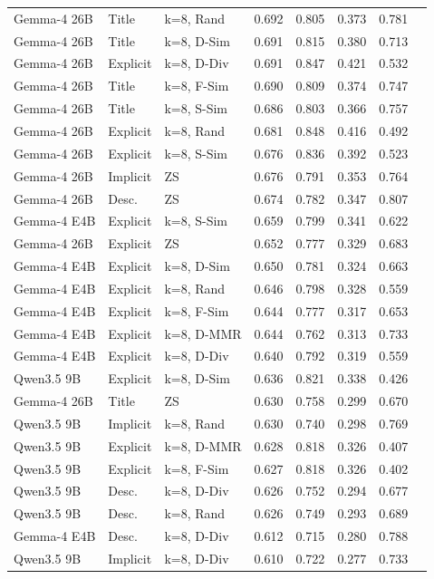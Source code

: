 \begin{longtable}{lllrrrrr}
Gemma-4 26B & Title & k=8, Rand & 0.692 & 0.805 & 0.373 & 0.781 \\
Gemma-4 26B & Title & k=8, D-Sim & 0.691 & 0.815 & 0.380 & 0.713 \\
Gemma-4 26B & Explicit & k=8, D-Div & 0.691 & 0.847 & 0.421 & 0.532 \\
Gemma-4 26B & Title & k=8, F-Sim & 0.690 & 0.809 & 0.374 & 0.747 \\
Gemma-4 26B & Title & k=8, S-Sim & 0.686 & 0.803 & 0.366 & 0.757 \\
Gemma-4 26B & Explicit & k=8, Rand & 0.681 & 0.848 & 0.416 & 0.492 \\
Gemma-4 26B & Explicit & k=8, S-Sim & 0.676 & 0.836 & 0.392 & 0.523 \\
Gemma-4 26B & Implicit & ZS & 0.676 & 0.791 & 0.353 & 0.764 \\
Gemma-4 26B & Desc. & ZS & 0.674 & 0.782 & 0.347 & 0.807 \\
Gemma-4 E4B & Explicit & k=8, S-Sim & 0.659 & 0.799 & 0.341 & 0.622 \\
Gemma-4 26B & Explicit & ZS & 0.652 & 0.777 & 0.329 & 0.683 \\
Gemma-4 E4B & Explicit & k=8, D-Sim & 0.650 & 0.781 & 0.324 & 0.663 \\
Gemma-4 E4B & Explicit & k=8, Rand & 0.646 & 0.798 & 0.328 & 0.559 \\
Gemma-4 E4B & Explicit & k=8, F-Sim & 0.644 & 0.777 & 0.317 & 0.653 \\
Gemma-4 E4B & Explicit & k=8, D-MMR & 0.644 & 0.762 & 0.313 & 0.733 \\
Gemma-4 E4B & Explicit & k=8, D-Div & 0.640 & 0.792 & 0.319 & 0.559 \\
Qwen3.5 9B & Explicit & k=8, D-Sim & 0.636 & 0.821 & 0.338 & 0.426 \\
Gemma-4 26B & Title & ZS & 0.630 & 0.758 & 0.299 & 0.670 \\
Qwen3.5 9B & Implicit & k=8, Rand & 0.630 & 0.740 & 0.298 & 0.769 \\
Qwen3.5 9B & Explicit & k=8, D-MMR & 0.628 & 0.818 & 0.326 & 0.407 \\
Qwen3.5 9B & Explicit & k=8, F-Sim & 0.627 & 0.818 & 0.326 & 0.402 \\
Qwen3.5 9B & Desc. & k=8, D-Div & 0.626 & 0.752 & 0.294 & 0.677 \\
Qwen3.5 9B & Desc. & k=8, Rand & 0.626 & 0.749 & 0.293 & 0.689 \\
Gemma-4 E4B & Desc. & k=8, D-Div & 0.612 & 0.715 & 0.280 & 0.788 \\
Qwen3.5 9B & Implicit & k=8, D-Div & 0.610 & 0.722 & 0.277 & 0.733 \\

\end{longtable}
